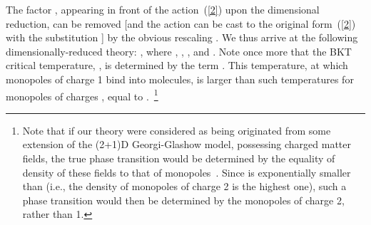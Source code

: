 \documentclass[a4paper,12pt]{article}
\begin{document}
The factor \myHighlight{$\beta$}\coordHE{}, appearing in front of the
action~(\ref{2}) upon the dimensional reduction,
can be removed [and the action can be cast to the original form~(\ref{2}) with the substitution \coordHE{}]
by the obvious rescaling \coordHE{}. We thus arrive at the following dimensionally-reduced theory:
\coordHE{},
where \coordHE{}, \coordHE{}, \coordHE{}, and
\coordHE{}. Note once more that the BKT critical temperature, \coordHE{}, is determined
by the term \coordHE{}. This temperature, at which monopoles of charge 1 bind into molecules,
is larger than such temperatures for monopoles of charges \coordHE{}, equal to \coordHE{}.~\footnote{
Note that if our theory were considered as being originated from some extension of the (2+1)D Georgi-Glashow model,
possessing charged matter fields, the true phase transition would be determined by the equality of density of these
fields to that of monopoles~\cite{2}.
Since \coordHE{} is exponentially smaller than \coordHE{} (i.e., the density of monopoles of charge 2
is the highest one), such a phase transition would then be determined by the
monopoles of charge 2, rather than 1.}
\end{document}

